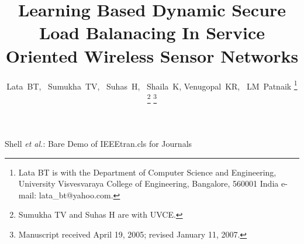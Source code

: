 \documentclass[journal]{IEEEtran}
\begin{document}
%
\title{Learning Based Dynamic Secure Load Balanacing In Service Oriented Wireless Sensor Networks}
%
%
%

\author{Lata~BT,~\IEEEmembership{}
        Sumukha~TV,~
        Suhas~H,~
	 Shaila~K,
	 Venugopal~KR,~
       LM~Patnaik%
\thanks{Lata BT is with the Department
of Computer Science and Engineering, University Visvesvaraya College of Engineering,
Bangalore, 560001 India e-mail: lata\_bt@yahoo.com.}%
\thanks{Sumukha TV and Suhas H are with UVCE.}%
\thanks{Manuscript received April 19, 2005; revised January 11, 2007.}}

% 
%



%
{Shell \MakeLowercase{\textit{et al.}}: Bare Demo of IEEEtran.cls for Journals}
% 
\end{document}
